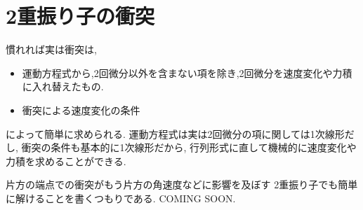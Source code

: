 \documentclass[a4paper,11pt]{jsarticle}
\begin{document}
\section{2重振り子の衝突}

慣れれば実は衝突は,
\begin{itemize}
  \item 運動方程式から,2回微分以外を含まない項を除き,2回微分を速度変化や力積に入れ替えたもの.
  \item 衝突による速度変化の条件
\end{itemize}
によって簡単に求められる.
運動方程式は実は2回微分の項に関しては1次線形だし,
衝突の条件も基本的に1次線形だから,
行列形式に直して機械的に速度変化や力積を求めることができる.

片方の端点での衝突がもう片方の角速度などに影響を及ぼす
2重振り子でも簡単に解けることを書くつもりである.
COMING SOON.
\end{document}
